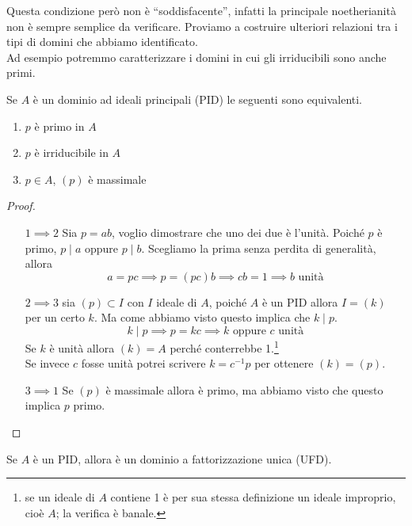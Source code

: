 Questa condizione però non è \enquote{soddisfacente}, infatti la principale noetherianità non è sempre semplice da verificare. Proviamo a costruire ulteriori relazioni tra i tipi di domini che abbiamo identificato. \\ Ad esempio potremmo caratterizzare i domini in cui gli irriducibili sono anche primi.
\begin{teorema}
	Se $A$ è un dominio ad ideali principali (PID) le seguenti sono equivalenti.
	\begin{enumerate}
		\item $p$ è primo in $A$
		\item $p$ è irriducibile in $A$
		\item $p\in A$, $(p)$ è massimale
	\end{enumerate}
\end{teorema}
\begin{proof}\
	\begin{itemize}
		\item[$1 \implies 2$] Sia $p=ab$, voglio dimostrare che uno dei due è l'unità. Poiché $p$ è primo, $p\mid a$ oppure $p\mid b$. Scegliamo la prima senza perdita di generalità, allora 
		\begin{equation*}
		a=pc \implies p=(pc)b\implies cb=1 \implies b \text{ unità}
		\end{equation*}
		\item[$2 \implies 3$] sia $(p)\subset I$ con $I$ ideale di $A$, poiché $A$ è un PID allora $I=(k)$ per un certo $k$. Ma come abbiamo visto questo implica che $k\mid p$.
		\begin{equation*}
		k\mid p \implies p=kc \implies k \text{ oppure } c \text{ unità}
		\end{equation*}
		Se $k$ è unità allora $(k)=A$ perché conterrebbe 1.\footnote{se un ideale di $A$ contiene 1 è per sua stessa definizione un ideale improprio, cioè $A$; la verifica è banale.} \\ Se invece $c$ fosse unità potrei scrivere $k=c^{-1}p$ per ottenere $(k)=(p)$.
		\item[$3 \implies 1$] Se $(p)$ è massimale allora è primo, ma abbiamo visto che questo implica $p$ primo.
	\end{itemize}
\end{proof}
\begin{teorema}
	Se $A$ è un PID, allora è un dominio a fattorizzazione unica (UFD).
\end{teorema}
